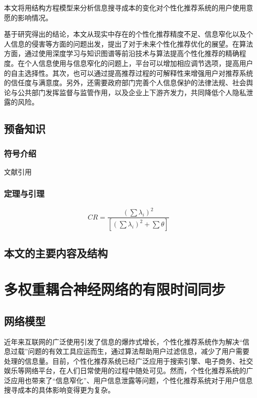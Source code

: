 \documentclass[a4paper,zihao=-4,UTF8]{ctexart}
\numberwithin{equation}{section}
\begin{document}
	本文将用结构方程模型来分析信息搜寻成本的变化对个性化推荐系统的用户使用意愿的影响情况。
	
	基于研究得出的结论，本文从现实中存在的个性化推荐精度不足、信息窄化以及个人信息的侵害等方面的问题出发，提出了对于未来个性化推荐优化的展望。在算法方面，通过使用深度学习与知识图谱等前沿技术与算法提高个性化推荐的精确程度。在个人信息使用与信息窄化的问题上，平台可以增加相应调节选项，提高用户的自主选择性。其次，也可以通过提高推荐过程的可解释性来增强用户对推荐系统的信任度与满意度。另外，还需要政府部门完善个人信息保护的法律法规、社会舆论与公共部门发挥监督与监管作用，以及企业上下游齐发力，共同降低个人隐私泄露的风险。
	\subsection{预备知识}
		\subsubsection{符号介绍}
		文献引用\cite{孙鲁平2016网上个性化推荐研究述评与展望}
		\subsubsection{定理与引理}
		\begin{equation}
			CR=\frac{\left (  \sum \lambda _{i}\right )^{2}}{\left [\left (  \sum \lambda _{i}\right )^{2}+\sum \theta   \right ]}
		\end{equation}
\subsection{本文的主要内容及结构}

\newpage
\section{多权重耦合神经网络的有限时间同步}
	\subsection{网络模型}
	近年来互联网的广泛使用引发了信息的爆炸式增长，个性化推荐系统作为解决“信息过载”问题的有效工具应运而生，通过算法帮助用户过滤信息，减少了用户需要处理的信息量。目前，个性化推荐系统已经广泛应用于搜索引擎、电子商务、社交娱乐等网络平台，在人们日常使用的过程中随处可见。然而，个性化推荐系统的广泛应用也带来了“信息窄化”、用户信息泄露等问题，个性化推荐系统对于用户信息搜寻成本的具体影响变得更为复杂。
	
\end{document}
